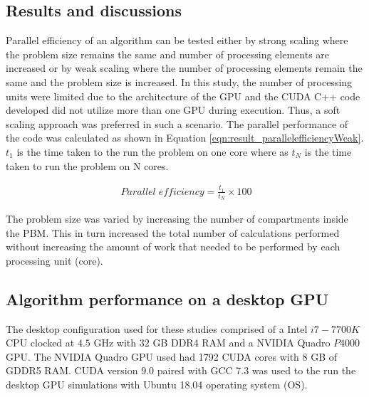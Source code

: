 \documentclass[preprint,10pt,authoryear,review]{elsarticle}
\begin{document}
\begin{linenumbers}
\section{Results and discussions}
\label{secResults}

Parallel efficiency of an algorithm can be tested either by strong scaling 
where the problem size remains the same and number of processing elements 
are increased or by weak scaling where the number of processing elements 
remain the same and the problem size is increased. In this study, the 
number of processing units were limited due to the architecture of the 
GPU and the CUDA C++ code developed did not utilize more than one GPU 
during execution. Thus, a soft scaling approach was preferred in such a 
scenario. The parallel performance of the code was calculated as shown in 
Equation \ref{eqn:result_parallelefficiencyWeak}. $t_1$ is the time taken 
to the run the problem on one core where as $t_N$ is the time taken to 
run the problem on N cores.

\begin{align}
\ Parallel\; efficiency = \frac{t_1}{t_N}\times 100
\label{eqn:result_parallelefficiencyWeak}
\end{align}

The problem size was varied by increasing the number of compartments inside 
the PBM. This in turn increased the total number of calculations performed 
without increasing the amount of work that needed to be performed by each 
processing unit (core).


\subsection{Algorithm performance on a desktop GPU}
The desktop configuration used for these studies comprised of a Intel $i7-7700K$  
CPU clocked at $4.5$ GHz with $32$ GB DDR4 RAM and a NVIDIA Quadro $P4000$ GPU. 
The NVIDIA Quadro GPU used had 1792 CUDA cores with 8 GB of GDDR5 RAM. 
CUDA version 9.0 paired with GCC 7.3 was used to the run the desktop GPU simulations 
with Ubuntu 18.04 operating system (OS).



\end{linenumbers}
\end{document}
